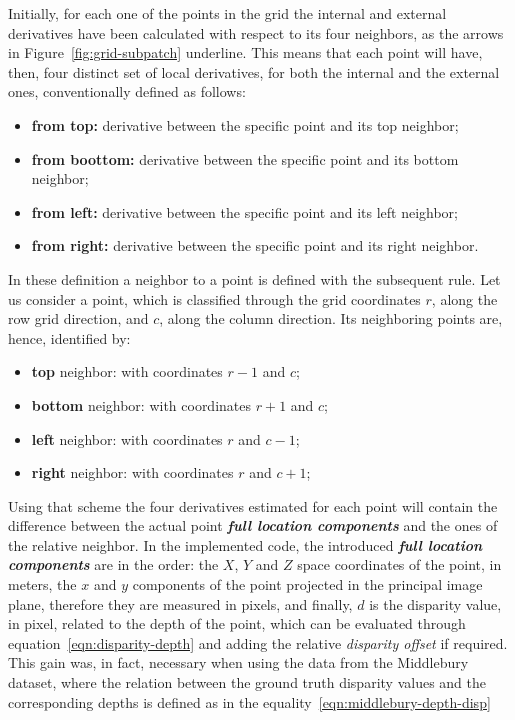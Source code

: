 Initially, for each one of the points in the grid the internal and external derivatives have been calculated with respect to its four neighbors, as the arrows in Figure~\ref{fig:grid-subpatch} underline. 
This means that each point will have, then, four distinct set of local derivatives, for both the internal and the external ones, conventionally defined as follows:
\begin{itemize}
	\item \textbf{from top:} derivative between the specific point and its top neighbor;
	\item \textbf{from boottom:} derivative between the specific point and its bottom neighbor;
	\item \textbf{from left:} derivative between the specific point and its left neighbor;
	\item \textbf{from right:} derivative between the specific point and its right neighbor.
\end{itemize}
In these definition a neighbor to a point is defined with the subsequent rule. 
Let us consider a point, which is classified through the grid coordinates $r$, along the row grid direction, and  $c$, along the column direction. 
Its neighboring points are, hence, identified by:
\begin{itemize}
	\item \textbf{top} neighbor: with coordinates $r - 1$ and $c$;
	\item \textbf{bottom} neighbor: with coordinates $r + 1$ and $c$;
	\item \textbf{left} neighbor: with coordinates $r$ and $c - 1$;
	\item \textbf{right} neighbor: with coordinates $r$ and $c + 1$;
\end{itemize}
Using that scheme the four derivatives estimated for each point will contain the difference between the actual point  \textbf{\textit{full location components}} and the ones of the relative neighbor.
In the implemented code, the introduced \textbf{\textit{full location components}} are in the order: the $X$, $Y$ and $Z$ space coordinates of the point, in meters, the $x$ and $y$ components of the point projected in the principal image plane, therefore they are measured in pixels, and finally, $d$ is the disparity value, in pixel, related to the depth of the point, which can be evaluated through equation~\ref{eqn:disparity-depth} and adding the relative \textit{disparity offset} if required.
This gain was, in fact, necessary when using the data from the Middlebury dataset, where the relation between the ground truth disparity values and the corresponding depths is defined as in the equality~\ref{eqn:middlebury-depth-disp}
